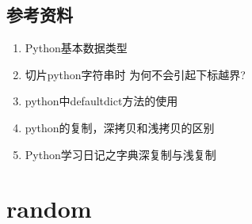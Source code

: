 \documentclass[letterpaper,10pt,english]{sphinxmanual}
\begin{document}
\subsection{参考资料}
\label{\detokenize{python/08_basicType:id4}}\begin{enumerate}
\item {} 
Python基本数据类型

\end{enumerate}
\begin{quote}

\end{quote}
\begin{enumerate}
\setcounter{enumi}{1}
\item {} 
切片python字符串时 为何不会引起下标越界?

\end{enumerate}
\begin{quote}

\end{quote}
\begin{enumerate}
\setcounter{enumi}{2}
\item {} 
python中defaultdict方法的使用

\end{enumerate}
\begin{quote}

\end{quote}
\begin{enumerate}
\setcounter{enumi}{3}
\item {} 
python的复制，深拷贝和浅拷贝的区别

\end{enumerate}
\begin{quote}

\end{quote}
\begin{enumerate}
\setcounter{enumi}{4}
\item {} 
Python学习日记之字典深复制与浅复制

\end{enumerate}
\begin{quote}

\end{quote}


\section{random}
\label{\detokenize{python/09_random:random}}\label{\detokenize{python/09_random::doc}}
\end{document}
